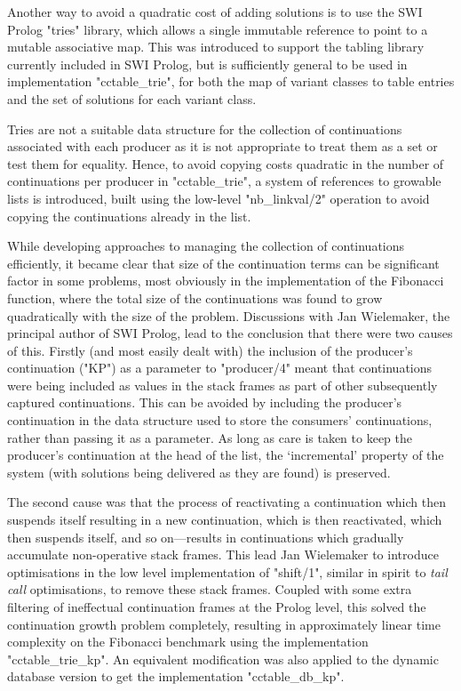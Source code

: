 Another way to avoid a quadratic cost of adding solutions is to use the SWI Prolog
"tries" library, which allows a single immutable reference to point to a mutable
associative map. This was introduced to support the tabling library currently included
in SWI Prolog, but is sufficiently general to be used in implementation "cctable_trie", 
for both the map of variant classes to table entries and the set of solutions for each
variant class.

Tries are not a suitable data structure for the collection of continuations associated
with each producer as it is not appropriate to treat them as a set or test them for equality.
Hence, to avoid copying costs quadratic in the number of continuations per producer 
in "cctable_trie", a system of references to growable lists is introduced, built using
the low-level "nb_linkval/2" operation to avoid copying the continuations already in the
list.

While developing approaches to managing the collection of continuations efficiently,
it became clear that size of the continuation terms can be significant factor in some problems, 
most obviously in the implementation of the Fibonacci function, where the total size
of the continuations was found to grow quadratically with the size of the problem.
Discussions with Jan Wielemaker, the principal author of SWI Prolog, lead to the conclusion
that there were two causes of this. Firstly (and most easily dealt with) the inclusion
of the producer's continuation ("KP") as a parameter to "producer/4" meant that continuations
were being included as values in the stack frames as part of other subsequently captured continuations.
This can be avoided by including the producer's continuation in the data structure used
to store the consumers' continuations, rather than passing it as a parameter. As long
as care is taken to keep the producer's continuation at the head of the list, the 
`incremental' property of the system (with solutions being delivered as they are found)
is preserved.

The second cause was that the process of reactivating a continuation which then suspends itself
resulting in a new continuation, which is then reactivated, which then suspends itself,
and so on---results in continuations which gradually accumulate non-operative stack frames.
This lead Jan Wielemaker to introduce optimisations in the low level implementation of 
"shift/1", similar in spirit to \emph{tail call}
optimisations, to remove these stack frames. Coupled with some extra filtering of ineffectual
continuation frames at the Prolog level, this solved the continuation growth problem 
completely, resulting in approximately linear time complexity on the Fibonacci benchmark using
the implementation "cctable_trie_kp".
An equivalent modification was also applied to the dynamic database version 
to get the implementation "cctable_db_kp".

